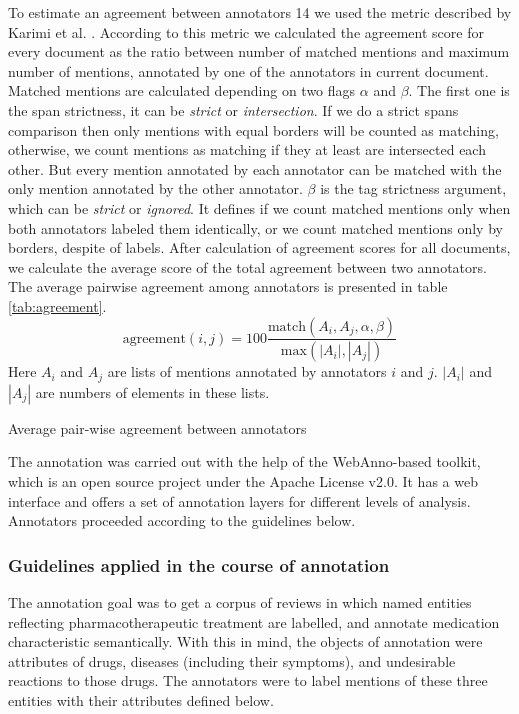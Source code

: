\documentclass[a4paper,fleqn,longmktitle]{cas-dc}
\begin{document}
 To estimate an agreement between annotators   
14
we used the metric described by Karimi et al.  \cite{karimi2015cadec}.  According to this metric we calculated the agreement score for every document as the ratio between number of matched mentions and maximum number of mentions, annotated by one of the annotators in current document. Matched mentions are calculated depending on two flags $\alpha$ and $\beta$. The first one is the span strictness, it can be \textit{strict} or \textit{intersection}. If we do a strict spans comparison then only mentions with equal borders will be counted as matching, otherwise, we count mentions as matching if they at least are intersected each other. But every mention annotated by each annotator can be matched with the only mention annotated by the other annotator. $\beta$   is the tag strictness argument, which can be \textit{strict} or \textit{ignored}. It defines if we count matched mentions only when both annotators labeled them identically, or we count matched mentions only by borders, despite of labels. After calculation of agreement scores for all documents, we calculate the average score of the total agreement between two annotators. The average pairwise agreement among annotators is presented in table  \ref{tab:agreement}.
$$\mathrm{agreement}(i,j) = 100\frac{\mathrm{match}(A_i,A_j,\alpha,\beta)}{\mathrm{max}(|A_i|,|A_j|)}$$
Here $A_i$ and $A_j$ are lists of mentions annotated by annotators $i$ and $j$. $|A_i|$ and $|A_j|$ are numbers of elements in these lists.
\begin{table}
\caption{Average pair-wise agreement  between annotators} 
\label{tab:agreement} 
 
\end{table}

The annotation was carried out with the help of the WebAnno-based toolkit, which is an open source project under the Apache License v2.0.
It has a web interface and offers a set of annotation layers for different levels of analysis.  Annotators proceeded according to the guidelines below.

\subsubsection{Guidelines applied in the course of annotation}
\label{subsec:Guidelines}
The annotation goal was to get a corpus of reviews in which named entities reflecting pharmacotherapeutic treatment are labelled, and annotate medication characteristic semantically. With this in mind, the objects of annotation were attributes of drugs, diseases (including their symptoms), and undesirable reactions to those drugs. The annotators were to label mentions of these three entities with their attributes defined below.
\end{document}
